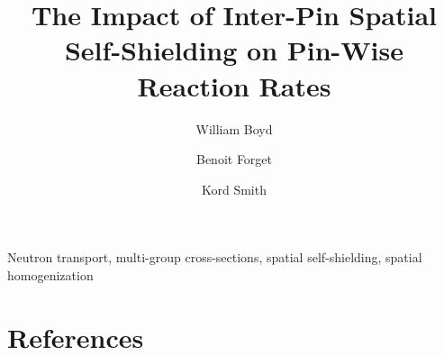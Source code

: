 \documentclass[authoryear,5p]{elsarticle}
\begin{document}
\begin{frontmatter}

\title{The Impact of Inter-Pin Spatial Self-Shielding on Pin-Wise Reaction Rates}

\author[MITRE]{William Boyd}

\author[MIT]{Benoit Forget\corref{}}

\author[MIT]{Kord Smith\corref{}}

\address[MITRE]{MITRE Corporation, 7525 Colshire Drive, McLean, VA 22102, United States}
\address[MIT]{Massachusetts Institute of Technology, Department of Nuclear Science and Engineering, 77 Massachusetts Avenue, Building 24, Cambridge, MA 02139, United States}


\begin{abstract}

\end{abstract}

\begin{keyword}
Neutron transport, multi-group cross-sections, spatial self-shielding, spatial homogenization
\end{keyword}

\end{frontmatter}










\section*{References}


\end{document}
